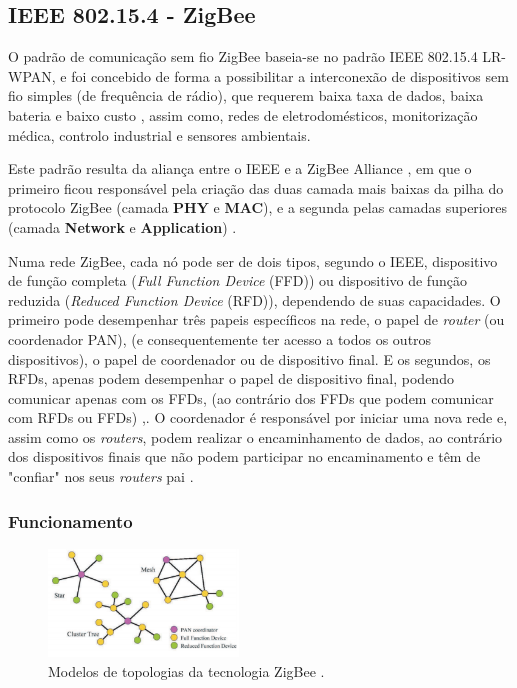 \documentclass[conference]{IEEEtran}
\begin{document}
\subsection{IEEE 802.15.4 - ZigBee}

O padrão de comunicação sem fio ZigBee baseia-se no padrão IEEE 802.15.4 LR-WPAN, e foi concebido de forma a possibilitar a interconexão de dispositivos sem fio simples (de frequência de rádio), que requerem baixa taxa de dados, baixa bateria e baixo custo \cite{kennedy2008review}, assim como, redes de eletrodomésticos, monitorização médica, controlo industrial e sensores ambientais.

Este padrão resulta da aliança entre o IEEE e a ZigBee Alliance , em que o primeiro ficou responsável pela criação das duas camada mais baixas da pilha do protocolo ZigBee (camada \textbf{PHY} e \textbf{MAC}), e a segunda pelas camadas superiores (camada \textbf{Network} e \textbf{Application}) \cite{liang2006impact}.

Numa rede ZigBee, cada nó pode ser de dois tipos, segundo o IEEE, dispositivo de função completa (\textit{Full Function Device} (FFD)) ou dispositivo de função reduzida (\textit{Reduced Function Device} (RFD)), dependendo de suas capacidades.
O primeiro pode desempenhar três papeis específicos na rede, o papel de \textit{router} (ou coordenador PAN), (e consequentemente ter acesso a todos os outros dispositivos), o papel de coordenador ou de dispositivo final.
E os segundos, os RFDs, apenas podem desempenhar o papel de dispositivo final, podendo comunicar apenas com os FFDs, (ao contrário dos FFDs que podem comunicar com RFDs ou FFDs) \cite{liang2006impact},\cite{sinem2004zigbee}.
O coordenador é responsável por iniciar uma nova rede e, assim como os \textit{routers}, podem realizar o encaminhamento de dados, ao contrário dos dispositivos finais que não podem participar no encaminamento e têm de "confiar" nos seus \textit{routers} pai \cite{liang2006impact}.


\subsubsection{Funcionamento}

\begin{figure}[!t]
  \centering
  \includegraphics[width=0.45\textwidth]{Modelos_Topologias_ZigBee.png}
  \caption{Modelos de topologias da tecnologia ZigBee \cite{sinem2004zigbee}.}
  \label{fig:topZigBee}
\end{figure}
\end{document}
